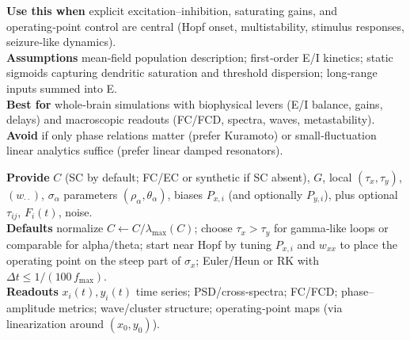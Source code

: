 \documentclass[12pt]{article}
\numberwithin{equation}{section}
\begin{document}
\begin{tcolorbox}[
  colback=gray!5,
  colframe=slate,
  colbacktitle=softblue!25,
  coltitle=softblue!60!black,
  fonttitle=\bfseries\small,
  title={\small When to Use It},
  boxrule=0.4pt, enhanced, sharp corners,
  left=4pt,right=4pt,top=3pt,bottom=3pt,
  boxsep=2pt, before skip=6pt, after skip=6pt
]
\scriptsize
\textbf{Use this when} explicit excitation–inhibition, saturating gains, and operating‑point control are central (Hopf onset, multistability, stimulus responses, seizure‑like dynamics).\\
\textbf{Assumptions} mean‑field population description; first‑order E/I kinetics; static sigmoids capturing dendritic saturation and threshold dispersion; long‑range inputs summed into E.\\
\textbf{Best for} whole‑brain simulations with biophysical levers (E/I balance, gains, delays) and macroscopic readouts (FC/FCD, spectra, waves, metastability).\\
\textbf{Avoid} if only phase relations matter (prefer Kuramoto) or small‑fluctuation linear analytics suffice (prefer linear damped resonators).
\end{tcolorbox}

\begin{tcolorbox}[
  colback=gray!5,
  colframe=slate,
  colbacktitle=softblue!25,
  coltitle=softblue!60!black,
  fonttitle=\bfseries\small,
  title={\small How to Use It},
  boxrule=0.4pt, enhanced, sharp corners,
  left=4pt,right=4pt,top=3pt,bottom=3pt,
  boxsep=2pt, before skip=6pt, after skip=6pt
]
\scriptsize
\textbf{Provide} $C$ (SC by default; FC/EC or synthetic if SC absent), $G$, local $(\tau_x,\tau_y)$, $(w_{\cdot\cdot})$, $\sigma_{\alpha}$ parameters $(\rho_{\alpha},\theta_{\alpha})$, biases $P_{x,i}$ (and optionally $P_{y,i}$), plus optional $\tau_{ij}$, $F_i(t)$, noise.\\
\textbf{Defaults} normalize $C\!\leftarrow\!C/\lambda_{\max}(C)$; choose $\tau_x\!>\!\tau_y$ for gamma‑like loops or comparable for alpha/theta; start near Hopf by tuning $P_{x,i}$ and $w_{xx}$ to place the operating point on the steep part of $\sigma_x$; Euler/Heun or RK with $\Delta t\!\le\!1/(100\,f_{\max})$.\\
\textbf{Readouts} $x_i(t),y_i(t)$ time series; PSD/cross‑spectra; FC/FCD; phase–amplitude metrics; wave/cluster structure; operating‑point maps (via linearization around $(x_0,y_0)$).
\end{tcolorbox}
\end{document}
